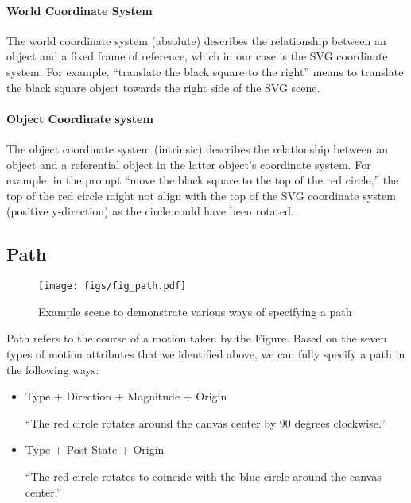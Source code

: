 \paragraph{World Coordinate System}
The world coordinate system (absolute) describes the relationship
between an object and a fixed frame of reference, which in our case is
the SVG coordinate system.  For example, ``translate the black square
to the right'' means to translate the black square object towards the
right side of the SVG scene.

\paragraph{Object Coordinate system}
The object coordinate system (intrinsic) describes the relationship between an object and a referential object in the latter object's coordinate system.
For example, in the prompt ``move the black square to the top of the red circle,'' the top of the red circle might not align with the top of the SVG coordinate system (positive y-direction) as the circle could have been rotated.

\subsection{Path}
\begin{figure}
    \centering
    \texttt{[image: figs/fig\_path.pdf]}
    \caption{Example scene to demonstrate various ways of specifying a path}
    \label{fig:path}
\end{figure}

Path refers to the course of a motion taken by the Figure.
Based on the seven types of motion attributes that we identified above, we can fully specify a path in the following ways:
\begin{itemize}
    \item Type + Direction + Magnitude + Origin
    
    ``The red circle rotates around the canvas center by 90 degrees clockwise.''
    
    \item Type + Post State + Origin
    
    ``The red circle rotates to coincide with the blue circle around the canvas center.''
\end{itemize}



